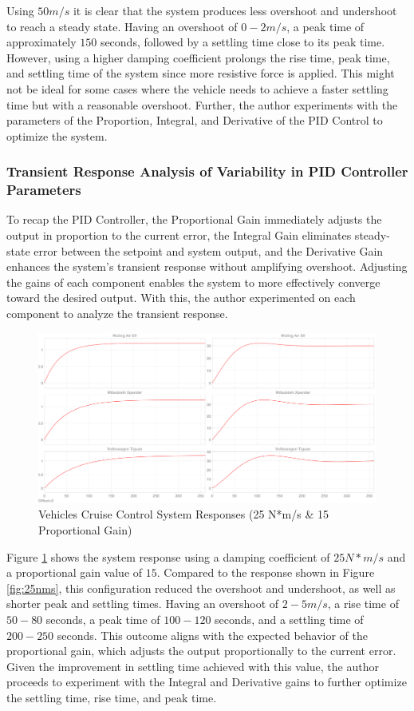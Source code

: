 \documentclass{article}
\begin{document}
Using $50 m/s$ it is clear that the system produces less overshoot and undershoot to reach a steady state. Having an overshoot of $0 - 2 m/s$, a peak time of approximately $150$ seconds, followed by a settling time close to its peak time. However, using a higher damping coefficient prolongs the rise time, peak time, and settling time of the system since more resistive force is applied. This might not be ideal for some cases where the vehicle needs to achieve a faster settling time but with a reasonable overshoot. Further, the author experiments with the parameters of the Proportion, Integral, and Derivative of the PID Control to optimize the system. 

\subsubsection{Transient Response Analysis of Variability in PID Controller Parameters}

To recap the PID Controller, the Proportional Gain immediately adjusts the output in proportion to the current error, the Integral Gain eliminates steady-state error between the setpoint and system output, and the Derivative Gain enhances the system's transient response without amplifying overshoot. Adjusting the gains of each component enables the system to more effectively converge toward the desired output. With this, the author experimented on each component to analyze the transient response.

\begin{figure}[htbp]
    \centering
    \includegraphics[width=1\linewidth]{img/15_PG.png}
    \caption{Vehicles Cruise Control System Responses (25 N*m/s \& 15 Proportional Gain)}
    \label{fig:15pg}
\end{figure}

Figure \ref{fig:15pg} shows the system response using a damping coefficient of $25 N*m / s$ and a proportional gain value of $15$. Compared to the response shown in Figure \ref{fig:25nms}, this configuration reduced the overshoot and undershoot, as well as shorter peak and settling times. Having an overshoot of $2 - 5m/s$, a rise time of $50 - 80$ seconds, a peak time of $100 - 120$ seconds, and a settling time of $200 - 250$ seconds. This outcome aligns with the expected behavior of the proportional gain, which adjusts the output proportionally to the current error. Given the improvement in settling time achieved with this value, the author proceeds to experiment with the Integral and Derivative gains to further optimize the settling time, rise time, and peak time.
\end{document}
